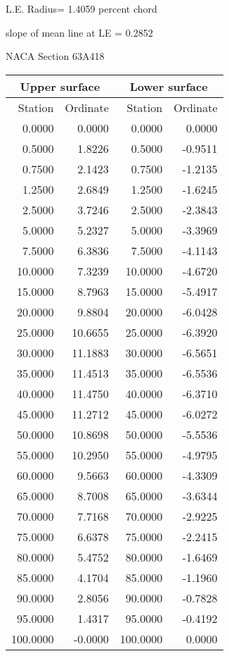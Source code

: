 \documentclass[11pt]{book}
\begin{document}
L.E. Radius=  1.4059 percent chord


 slope of mean line at LE =  0.2852
 \newpage
  \label{s63A418}
 \begin{Large}
 NACA Section 63A418
 \end{Large}
  
 \vspace{8mm}
 \begin{tabular}{|r|r|r|r|} \hline 
 \multicolumn{2}{|c|}{Upper surface} & \multicolumn{2}{|c|}{Lower surface} \\
 \hline
 Station & Ordinate & Station & Ordinate \\
 \hline
0.0000 & 0.0000 & 0.0000 & 0.0000 \\
0.5000 & 1.8226 & 0.5000 & -0.9511 \\
0.7500 & 2.1423 & 0.7500 & -1.2135 \\
1.2500 & 2.6849 & 1.2500 & -1.6245 \\
2.5000 & 3.7246 & 2.5000 & -2.3843 \\
5.0000 & 5.2327 & 5.0000 & -3.3969 \\
7.5000 & 6.3836 & 7.5000 & -4.1143 \\
10.0000 & 7.3239 & 10.0000 & -4.6720 \\
15.0000 & 8.7963 & 15.0000 & -5.4917 \\
20.0000 & 9.8804 & 20.0000 & -6.0428 \\
25.0000 & 10.6655 & 25.0000 & -6.3920 \\
30.0000 & 11.1883 & 30.0000 & -6.5651 \\
35.0000 & 11.4513 & 35.0000 & -6.5536 \\
40.0000 & 11.4750 & 40.0000 & -6.3710 \\
45.0000 & 11.2712 & 45.0000 & -6.0272 \\
50.0000 & 10.8698 & 50.0000 & -5.5536 \\
55.0000 & 10.2950 & 55.0000 & -4.9795 \\
60.0000 & 9.5663 & 60.0000 & -4.3309 \\
65.0000 & 8.7008 & 65.0000 & -3.6344 \\
70.0000 & 7.7168 & 70.0000 & -2.9225 \\
75.0000 & 6.6378 & 75.0000 & -2.2415 \\
80.0000 & 5.4752 & 80.0000 & -1.6469 \\
85.0000 & 4.1704 & 85.0000 & -1.1960 \\
90.0000 & 2.8056 & 90.0000 & -0.7828 \\
95.0000 & 1.4317 & 95.0000 & -0.4192 \\
100.0000 & -0.0000 & 100.0000 & 0.0000 \\
 \hline 
 \end{tabular}
\end{document}
